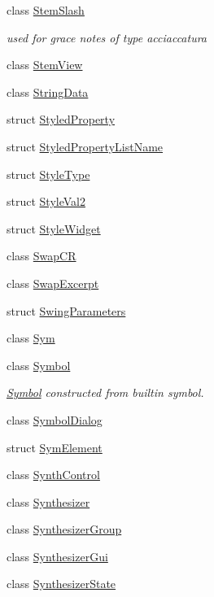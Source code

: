 \begin{DoxyCompactItemize}
class \hyperlink{class_ms_1_1_stem_slash}{Stem\+Slash}
\begin{DoxyCompactList}\small\item\em used for grace notes of type acciaccatura \end{DoxyCompactList}\item 
class \hyperlink{class_ms_1_1_stem_view}{Stem\+View}
\item 
class \hyperlink{class_ms_1_1_string_data}{String\+Data}
\item 
struct \hyperlink{struct_ms_1_1_styled_property}{Styled\+Property}
\item 
struct \hyperlink{struct_ms_1_1_styled_property_list_name}{Styled\+Property\+List\+Name}
\item 
struct \hyperlink{struct_ms_1_1_style_type}{Style\+Type}
\item 
struct \hyperlink{struct_ms_1_1_style_val2}{Style\+Val2}
\item 
struct \hyperlink{struct_ms_1_1_style_widget}{Style\+Widget}
\item 
class \hyperlink{class_ms_1_1_swap_c_r}{Swap\+CR}
\item 
class \hyperlink{class_ms_1_1_swap_excerpt}{Swap\+Excerpt}
\item 
struct \hyperlink{struct_ms_1_1_swing_parameters}{Swing\+Parameters}
\item 
class \hyperlink{class_ms_1_1_sym}{Sym}
\item 
class \hyperlink{class_ms_1_1_symbol}{Symbol}
\begin{DoxyCompactList}\small\item\em \hyperlink{class_ms_1_1_symbol}{Symbol} constructed from builtin symbol. \end{DoxyCompactList}\item 
class \hyperlink{class_ms_1_1_symbol_dialog}{Symbol\+Dialog}
\item 
struct \hyperlink{struct_ms_1_1_sym_element}{Sym\+Element}
\item 
class \hyperlink{class_ms_1_1_synth_control}{Synth\+Control}
\item 
class \hyperlink{class_ms_1_1_synthesizer}{Synthesizer}
\item 
class \hyperlink{class_ms_1_1_synthesizer_group}{Synthesizer\+Group}
\item 
class \hyperlink{class_ms_1_1_synthesizer_gui}{Synthesizer\+Gui}
\item 
class \hyperlink{class_ms_1_1_synthesizer_state}{Synthesizer\+State}
\item 

\end{DoxyCompactItemize}
